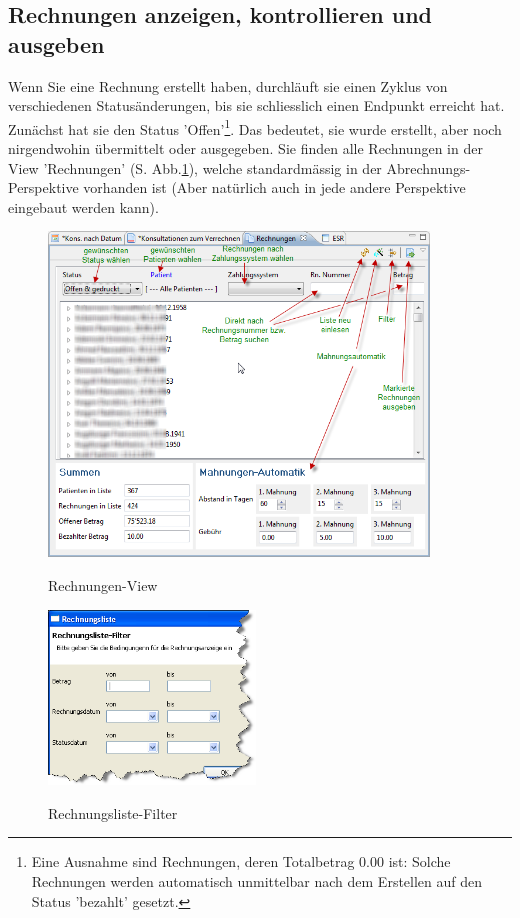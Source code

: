 \documentclass[a4paper]{scrartcl}
\begin{document}
\subsection{Rechnungen anzeigen, kontrollieren und ausgeben}
Wenn Sie eine Rechnung erstellt haben, durchläuft sie einen Zyklus von verschiedenen Statusänderungen, bis sie schliesslich einen Endpunkt erreicht hat. Zunächst hat sie den Status 'Offen'\footnote{Eine Ausnahme sind Rechnungen, deren Totalbetrag 0.00 ist: Solche Rechnungen werden automatisch unmittelbar nach dem Erstellen auf den Status 'bezahlt' gesetzt.}. Das bedeutet, sie wurde erstellt, aber noch nirgendwohin übermittelt oder ausgegeben. Sie finden alle Rechnungen in der View 'Rechnungen' (S. Abb.\ref{fig:abr11}), welche standardmässig in der Abrechnungs-Perspektive vorhanden ist (Aber natürlich auch in jede andere Perspektive eingebaut werden kann).
\begin{figure}
  \center
  \includegraphics[width=0.9\textwidth]{abr11}\\
  \caption{Rechnungen-View}\label{fig:abr11}
\end{figure}
\begin{figure}
  \center
  \includegraphics[width=5.5cm]{abr12}\\
  \caption{Rechnungsliste-Filter}\label{fig:abr12}
\end{figure}
\end{document}
